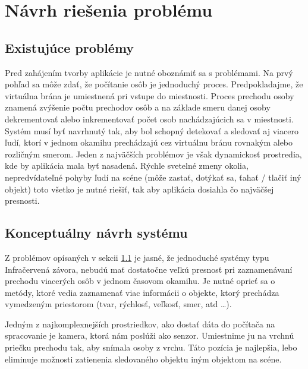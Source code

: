 

\chapter{Návrh riešenia problému}
\section{Existujúce problémy}
\label{sec:problems}
Pred zahájením tvorby aplikácie je nutné oboznámiť sa s problémami. Na prvý pohľad  sa môže zdať, že  počítanie osôb je jednoduchý proces. Predpokladajme, že virtuálna brána je umiestnená pri vstupe do miestnosti. Proces prechodu osoby znamená zvýšenie počtu prechodov osôb a na základe smeru danej osoby dekrementovať alebo inkrementovať počet osob nachádzajúcich sa v miestnosti. Systém musí byť navrhnutý tak, aby bol schopný detekovať a sledovať aj viacero ľudí, ktorí v jednom okamihu prechádzajú cez virtuálnu bránu rovnakým alebo rozličným smerom.  Jeden z najväčších problémov je však dynamickosť prostredia, kde by aplikácia mala byť nasadená. Rýchle svetelné zmeny okolia, nepredvídateľné pohyby ľudí na scéne (môže zastať, dotýkať sa, ťahať / tlačiť iný objekt)  toto všetko je nutné riešiť, tak aby aplikácia dosiahla čo najväčšej presnosti. 

\section{Konceptuálny návrh systému}
\label{sec:draft}
Z problémov opísaných v sekcii \ref{sec:problems} je jasné, že jednoduché systémy typu Infračervená závora, nebudú mať dostatočne veľkú presnosť pri zaznamenávaní prechodu viacerých osôb v jednom časovom okamihu. Je nutné oprieť sa o metódy, ktoré vedia zaznamenať viac informácii o objekte, ktorý prechádza vymedzeným priestorom (tvar, rýchlosť, veľkosť, smer, atd …). 

Jedným z najkomplexnejších prostriedkov, ako dostať dáta do počítača na spracovanie je kamera, ktorá nám poslúži ako senzor. Umiestnime ju na vrchnú priečku prechodu tak, aby snímala osoby z vrchu. Táto pozícia je najlepšia, lebo eliminuje možnosti zatienenia sledovaného objektu iným objektom na scéne.  

